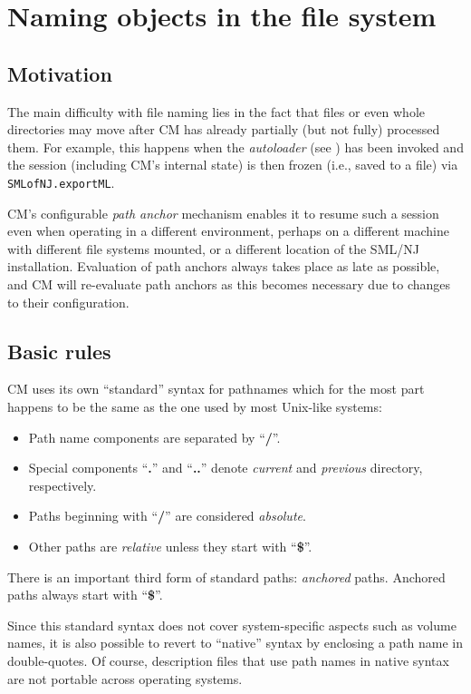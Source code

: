 %

\chapter{Naming objects in the file system}

\section{Motivation}

The main difficulty with file naming lies in the fact that files or
even whole directories may move after CM has already partially (but
not fully) processed them.  For example, this happens when the {\em
autoloader} (see ) has been invoked and the
session (including CM's internal state) is then frozen (i.e., saved to
a file) via {\tt SMLofNJ.exportML}.

CM's configurable {\em path anchor} mechanism enables it to resume
such a session even when operating in a different environment, perhaps
on a different machine with different file systems mounted, or a
different location of the SML/NJ installation.  Evaluation of path
anchors always takes place as late as possible, and CM will re-evaluate
path anchors as this becomes necessary due to changes to their
configuration.

\section{Basic rules}
\label{sec:basicrules}

CM uses its own ``standard'' syntax for pathnames which for the most
part happens to be the same as the one used by most Unix-like systems:
\begin{itemize}
\item Path name components are separated by ``{\bf /}''.
\item Special components ``{\bf .}'' and ``{\bf ..}'' denote {\em
current} and {\em previous} directory, respectively.
\item Paths beginning
with ``{\bf /}'' are considered {\em absolute}.
\item Other paths are {\em relative} unless they start with ``{\bf \$}''.
\end{itemize}
\noindent There is an important third form of standard paths: {\em
anchored} paths.  Anchored paths always start with ``{\bf \$}''.

Since this standard syntax does not cover system-specific aspects such
as volume names, it is also possible to revert to ``native'' syntax by
enclosing a path name in double-quotes.  Of course, description files
that use path names in native syntax are not portable across operating
systems.

